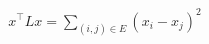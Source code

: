 \documentclass[preview]{standalone}
\begin{document}
\begin{align*}
x^\top L x = \sum_{(i,j)\in E}(x_i-x_j)^2
\end{align*}
\end{document}
